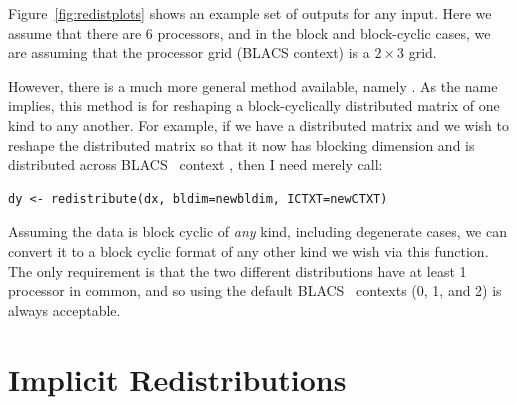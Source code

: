 Figure~\ref{fig:redistplots} shows an 
example set of outputs for any  input.  Here we assume that there 
are 6 processors, and in the block and block-cyclic cases, we are assuming that 
the processor grid (BLACS context) is a $2\times 3$ grid.

However, there is a much more general method available, namely 
.  As the name implies, this method is for reshaping a 
block-cyclically distributed matrix of one kind to any another.  For example, if 
we have a distributed matrix  and we wish to reshape the distributed 
matrix so that it now has blocking dimension  and is distributed 
across BLACS~ context , then I need merely 
call:

\begin{lstlisting}[language=rr]
dy <- redistribute(dx, bldim=newbldim, ICTXT=newCTXT)
\end{lstlisting}

Assuming the data is block cyclic of \emph{any} kind, including degenerate 
cases, we can convert it to a block cyclic format of any other kind we wish via 
this  function.  The only requirement is that the two 
different distributions have at least 1 processor in common, and so using the 
default BLACS~ contexts (0, 1, and 2) is always acceptable.




\section{Implicit Redistributions}
\label{sec:implicitredist}

